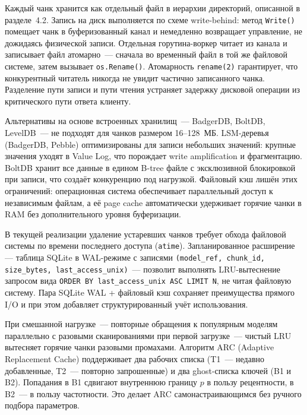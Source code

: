  Каждый чанк хранится как отдельный файл в иерархии директорий, описанной в разделе~4.2. Запись на диск выполняется по схеме write-behind: метод \texttt{Write()} помещает чанк в буферизованный канал и немедленно возвращает управление, не дожидаясь физической записи. Отдельная горутина-воркер читает из канала и записывает файл атомарно~--- сначала во временный файл в той же файловой системе, затем вызывает \texttt{os.Rename()}. Атомарность \texttt{rename(2)} гарантирует, что конкурентный читатель никогда не увидит частично записанного чанка. Разделение пути записи и пути чтения устраняет задержку дисковой операции из критического пути ответа клиенту.

 Альтернативы на основе встроенных хранилищ~--- BadgerDB, BoltDB, LevelDB~--- не подходят для чанков размером 16--128~МБ. LSM-деревья (BadgerDB, Pebble) оптимизированы для записи небольших значений: крупные значения уходят в Value Log, что порождает write amplification и фрагментацию. BoltDB хранит все данные в едином B-tree файле с эксклюзивной блокировкой при записи, что создаёт конкуренцию под нагрузкой. Файловый кэш лишён этих ограничений: операционная система обеспечивает параллельный доступ к независимым файлам, а её page cache автоматически удерживает горячие чанки в RAM без дополнительного уровня буферизации.

 В текущей реализации удаление устаревших чанков требует обхода файловой системы по времени последнего доступа (\texttt{atime}). Запланированное расширение --- таблица SQLite в WAL-режиме с записями \texttt{(model\_ref, chunk\_id, size\_bytes, last\_access\_unix)}~--- позволит выполнять LRU-вытеснение запросом вида \texttt{ORDER BY last\_access\_unix ASC LIMIT N}, не читая файловую систему. Пара SQLite WAL + файловый кэш сохраняет преимущества прямого I/O и при этом добавляет структурированный учёт использования.

 При смешанной нагрузке~--- повторные обращения к популярным моделям параллельно с разовыми сканированиями при первой загрузке~--- чистый LRU вытесняет горячие чанки разовыми промахами. Алгоритм ARC (Adaptive Replacement Cache) поддерживает два рабочих списка (T1~--- недавно добавленные, T2~--- повторно запрошенные) и два ghost-списка ключей (B1 и B2). Попадания в B1 сдвигают внутреннюю границу $p$ в пользу рецентности, в B2~--- в пользу частотности. Это делает ARC самонастраивающимся без ручного подбора параметров.


